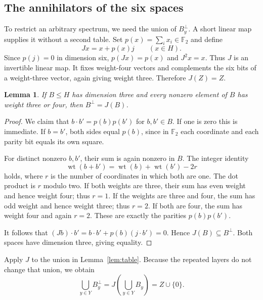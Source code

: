\documentclass[11pt]{article}
\numberwithin{equation}{section}
\newtheorem{lemma}[theorem]{Lemma}
\theoremstyle{definition}
\theoremstyle{remark}\newtheorem{remark}[theorem]{Remark}
\newcommand{\F}{\mathbb F_2}
\newcommand{\wt}{\operatorname{wt}}
\begin{document}
\subsection{The annihilators of the six spaces}
To restrict an arbitrary spectrum, we need the union of $B_y^\perp$. A short linear map supplies it without a second table. Set $p(x)=\sum_i x_i\in\F$ and define
\[
 Jx=x+p(x)j\qquad(x\in H).
\]
Since $p(j)=0$ in dimension six, $p(Jx)=p(x)$ and $J^2x=x$. Thus $J$ is an invertible linear map. It fixes weight-four vectors and complements the six bits of a weight-three vector, again giving weight three. Therefore $J(Z)=Z$.

\begin{lemma}\label{lem:J}
If $B\le H$ has dimension three and every nonzero element of $B$ has weight three or four, then $B^\perp=J(B)$.
\end{lemma}
\begin{proof}
We claim that $b\cdot b'=p(b)p(b')$ for $b,b'\in B$. If one is zero this is immediate. If $b=b'$, both sides equal $p(b)$, since in $\F$ each coordinate and each parity bit equals its own square.

For distinct nonzero $b,b'$, their sum is again nonzero in $B$. The integer identity
\[
 \wt(b+b')=\wt(b)+\wt(b')-2r
\]
holds, where $r$ is the number of coordinates in which both are one. The dot product is $r$ modulo two. If both weights are three, their sum has even weight and hence weight four; thus $r=1$. If the weights are three and four, the sum has odd weight and hence weight three; thus $r=2$. If both are four, the sum has weight four and again $r=2$. These are exactly the parities $p(b)p(b')$.

It follows that $(Jb)\cdot b'=b\cdot b'+p(b)(j\cdot b')=0$. Hence $J(B)\subseteq B^\perp$. Both spaces have dimension three, giving equality.
\end{proof}
Apply $J$ to the union in Lemma~\ref{lem:table}. Because the repeated layers do not change that union, we obtain
\begin{equation}\label{eq:dualunion}
 \bigcup_{y\in Y}B_y^\perp=J\left(\bigcup_{y\in Y}B_y\right)=Z\cup\{0\}.
\end{equation}
\end{document}
